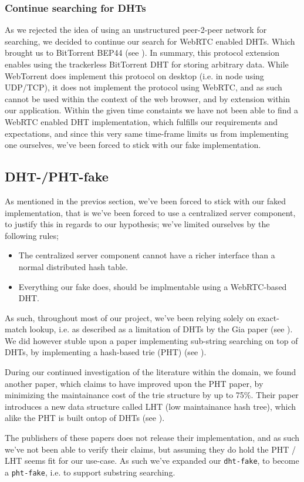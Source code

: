 \subsubsection{Continue searching for DHTs}
As we rejected the idea of using an unstructured peer-2-peer network for
searching, we decided to continue our search for WebRTC enabled DHTs. Which
brought us to BitTorrent BEP44 (see \citep{bittorrent:bep44}). In summary, this
protocol extension enables using the trackerless BitTorrent DHT for storing
arbitrary data. While WebTorrent does implement this protocol on desktop (i.e.
in node using UDP/TCP), it does not implement the protocol using WebRTC, and as
such cannot be used within the context of the web browser, and by extension
within our application.
\newline\newline
Within the given time constaints we have not been able to find a WebRTC enabled
DHT implementation, which fulfills our requirements and expectations, and since
this very same time-frame limits us from implementing one ourselves, we've been
forced to stick with our fake implementation.

\subsection{DHT-/PHT-fake}
As mentioned in the previos section, we've been forced to stick with our faked
implementation, that is we've been forced to use a centralized server component,
to justify this in regards to our hypothesis; we've limited ourselves by the 
following rules;
\begin{itemize}
\item The centralized server component cannot have a richer interface than a 
    normal distributed hash table.
\item Everything our fake does, should be implmentable using a WebRTC-based DHT.
\end{itemize}
As such, throughout most of our project, we've been relying solely on
exact-match lookup, i.e. as described as a limitation of DHTs by the Gia paper
(see \citep{Chawathe:Gia}). We did however stuble upon a paper implementing 
sub-string searching on top of DHTs, by implementing a hash-based trie (PHT)
(see \citep{Ramabhadran:PHT}).

During our continued investigation of the literature within the domain, we 
found another paper, which claims to have improved upon the PHT paper, by 
minimizing the maintainance cost of the trie structure by up to 75\%. Their
paper introduces a new data structure called LHT (low maintainance hash tree),
which alike the PHT is built ontop of DHTs (see \citep{Tang:LHT}).

The publishers of these papers does not release their implementation, and as
such we've not been able to verify their claims, but assuming they do hold the
PHT / LHT seems fit for our use-case. As such we've expanded our \verb|dht-fake|,
to become a \verb|pht-fake|, i.e. to support substring searching.

